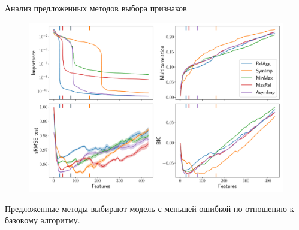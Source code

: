 \documentclass[10pt]{beamer}
\begin{document}
\begin{frame}{Анализ предложенных методов выбора признаков}
	\begin{figure}
		\includegraphics[width=0.85\linewidth]{figs/ecog_3_30_metrics.pdf}
	\end{figure}
	Предложенные методы выбирают модель с меньшей ошибкой по отношению к базовому алгоритму.
\end{frame}
\end{document}
